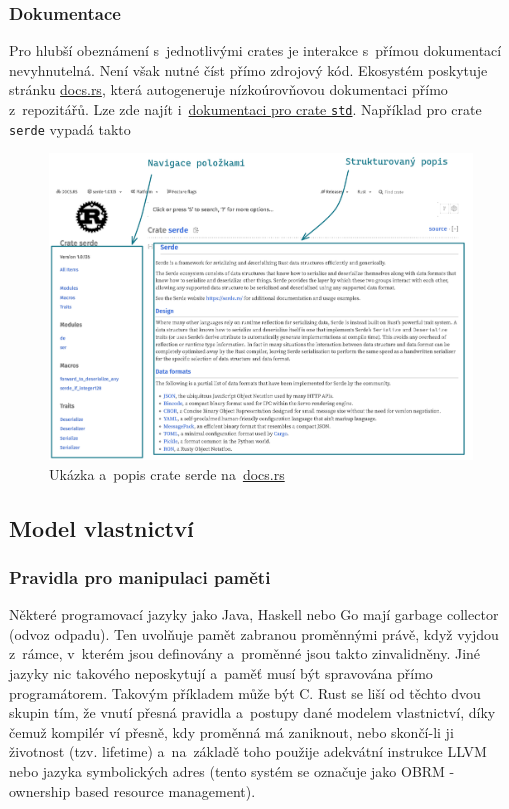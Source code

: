 \documentclass[a4paper, 12pt, twoside]{article} %
\newcommand{\rust}[1]{\texttt{#1}}
\begin{document}
		\subsubsection*{Dokumentace}
			Pro hlubší obeznámení s~jednotlivými crates je interakce s~přímou dokumentací nevyhnutelná. Není však nutné číst přímo zdrojový kód. Ekosystém poskytuje stránku \href{https://docs.rs}{docs.rs}, která autogeneruje nízkoúrovňovou dokumentaci přímo z~repozitářů. Lze zde najít i~\href{https://docs.rs/rustc-std-workspace-std/latest/std/index.html}{dokumentaci pro crate \rust{std}}. Například pro crate \rust{serde} vypadá takto
			\begin{center}
				\begin{figure}[H]
					\centering
					\includegraphics[width=\linewidth]{docsrs}
					\caption{Ukázka a~popis crate serde na~\href{https://docs.rs}{docs.rs}}
					\label{fig:docsrs}
				\end{figure}
			\end{center}

	\subsection{Model vlastnictví}
		\subsubsection*{Pravidla pro manipulaci paměti}
			Některé programovací jazyky jako Java, Haskell nebo Go mají garbage collector (odvoz odpadu). Ten uvolňuje pamět zabranou proměnnými právě, když vyjdou z~rámce, v~kterém jsou definovány a~proměnné jsou takto zinvalidněny. Jiné jazyky nic takového neposkytují a~paměť musí být spravována přímo programátorem. Takovým příkladem může být C. Rust se liší od těchto dvou skupin tím, že vnutí přesná pravidla a~postupy dané modelem vlastnictví, díky čemuž kompilér ví přesně, kdy proměnná má zaniknout, nebo skončí-li ji životnost (tzv. lifetime) a~na~základě toho použije adekvátní instrukce LLVM nebo jazyka symbolických adres (tento systém se označuje jako OBRM - ownership based resource management).
\end{document}
